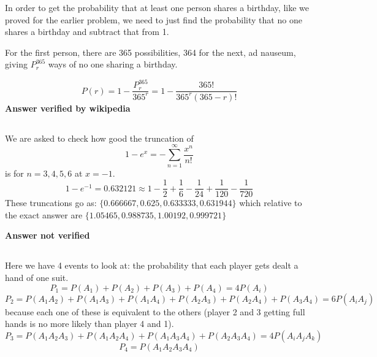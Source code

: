 In order to get the probability that at least one person shares a birthday, like we proved for the earlier problem, we need to just find the probability that no one shares a birthday and subtract that from 1.  

For the first person, there are 365 possibilities, 364 for the next, ad nauseum, giving $P^{365}_r$ ways of no one sharing a birthday.

\begin{equation}
	P(r) = 1 - \frac{P^{365}_r}{365^r} = 1 - \frac{365!}{365^r(365-r)!}
\label{answern2.14}
\end{equation}
\textbf{Answer verified by wikipedia}

\subsection{}

We are asked to check how good the truncation of
\begin{equation}
	1-e^x = -\sum_{n=1}^\infty \frac{x^n}{n!}
\end{equation}
is for $n=3, 4, 5, 6$ at $x=-1$.  
\begin{equation}
	1-e^{-1} = 0.632121 \approx 1 - \frac{1}{2} + \frac{1}{6} - \frac{1}{24}  + \frac{1}{120} - \frac{1}{720} 
\end{equation}
These truncations go as: $\{0.666667,0.625,0.633333,0.631944\}$ which relative to the exact answer are $\{1.05465,0.988735,1.00192,0.999721\}$


\textbf{Answer not verified}

\subsection{}

Here we have 4 events to look at: the probability that each player gets dealt a hand of one suit.  
\begin{equation}
	P_1 = P(A_1) + P(A_2) + P(A_3) + P(A_4) = 4P(A_i)
\end{equation}
\begin{equation}
	P_2 = P(A_1 A_2) + P(A_1 A_3) + P(A_1 A_4) + P(A_2 A_3) + P(A_2 A_4) + P(A_3 A_4) = 6 P(A_i A_j)
\end{equation}
because each one of these is equivalent to the others (player 2 and 3 getting full hands is no more likely than player 4 and 1).  
\begin{equation}
	P_3 = P(A_1 A_2 A_3) + P(A_1 A_2 A_4) + P(A_1 A_3 A_4) + P(A_2 A_3 A_4) = 4 P(A_i A_j A_k)
\end{equation}
\begin{equation}
	P_4 = P(A_1 A_2 A_3 A_4)
\end{equation}

